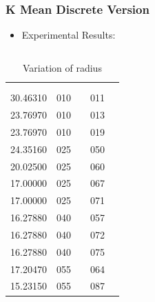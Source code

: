 \documentclass[blue]{beamer}
\begin{document}
\begin{frame}
 \frametitle{K Mean Discrete Version}
 \begin{itemize}
  \item Experimental Results:
   \end{itemize}
  \tiny
  \begin{columns}
   { 
   \begin{table}[H]
   \caption{Variation of radius}
  \begin{tabular}{||l|c|c|c|c||} \hline
   {\color{red}{Radius}} & {\color{red}{K}} & {\color{red}{actual K}} & {\color{red}{red points}} \\
   & & &   {\color{red}{covered}} \\ \hline
   30.46310 & 010 & {\color{blue}{10}} & 011 \\ \hline
   23.76970 & 010 & {\color{blue}{10}} & 013 \\ \hline
   23.76970 & 010 & {\color{blue}{10}} & 019 \\ \hline \hline
   24.35160 & 025 & {\color{blue}{22}} & 050 \\ \hline
   20.02500 & 025 & {\color{blue}{22}} & 060 \\ \hline
   17.00000 & 025 & {\color{blue}{22}} & 067 \\ \hline
   17.00000 & 025 & {\color{blue}{22}} & 071 \\ \hline \hline 
   16.27880 & 040 & {\color{blue}{31}}& 057 \\ \hline
   16.27880 & 040 & {\color{blue}{31}} & 072 \\ \hline
   16.27880 & 040 & {\color{blue}{31}} & 075 \\ \hline \hline
   17.20470 & 055 & {\color{blue}{37}} & 064 \\ \hline
   15.23150 & 055 & {\color{blue}{37}} & 087 \\ \hline \hline 
   

\end{tabular}
\end{table}}
\end{columns}
\end{frame}
\end{document}
